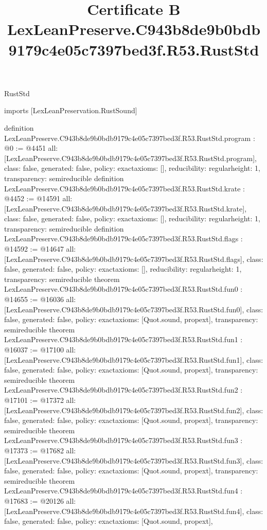 \begin{lexlean}{RustStd}
\title{Certificate B LexLeanPreserve.C943b8de9b0bdb9179c4e05c7397bed3f.R53.RustStd}
\begin{coremodule}
imports [LexLeanPreservation.RustSound]

definition LexLeanPreserve.C943b8de9b0bdb9179c4e05c7397bed3f.R53.RustStd.program : @0 := @4451 {
  all: [LexLeanPreserve.C943b8de9b0bdb9179c4e05c7397bed3f.R53.RustStd.program],
  class: false,
  generated: false,
  policy: exact{axioms: []},
  reducibility: regular{height: 1},
  transparency: semireducible
}
definition LexLeanPreserve.C943b8de9b0bdb9179c4e05c7397bed3f.R53.RustStd.krate : @4452 := @14591 {
  all: [LexLeanPreserve.C943b8de9b0bdb9179c4e05c7397bed3f.R53.RustStd.krate],
  class: false,
  generated: false,
  policy: exact{axioms: []},
  reducibility: regular{height: 1},
  transparency: semireducible
}
definition LexLeanPreserve.C943b8de9b0bdb9179c4e05c7397bed3f.R53.RustStd.flags : @14592 := @14647 {
  all: [LexLeanPreserve.C943b8de9b0bdb9179c4e05c7397bed3f.R53.RustStd.flags],
  class: false,
  generated: false,
  policy: exact{axioms: []},
  reducibility: regular{height: 1},
  transparency: semireducible
}
theorem LexLeanPreserve.C943b8de9b0bdb9179c4e05c7397bed3f.R53.RustStd.fun0 : @14655 := @16036 {
  all: [LexLeanPreserve.C943b8de9b0bdb9179c4e05c7397bed3f.R53.RustStd.fun0],
  class: false,
  generated: false,
  policy: exact{axioms: [Quot.sound, propext]},
  transparency: semireducible
}
theorem LexLeanPreserve.C943b8de9b0bdb9179c4e05c7397bed3f.R53.RustStd.fun1 : @16037 := @17100 {
  all: [LexLeanPreserve.C943b8de9b0bdb9179c4e05c7397bed3f.R53.RustStd.fun1],
  class: false,
  generated: false,
  policy: exact{axioms: [Quot.sound, propext]},
  transparency: semireducible
}
theorem LexLeanPreserve.C943b8de9b0bdb9179c4e05c7397bed3f.R53.RustStd.fun2 : @17101 := @17372 {
  all: [LexLeanPreserve.C943b8de9b0bdb9179c4e05c7397bed3f.R53.RustStd.fun2],
  class: false,
  generated: false,
  policy: exact{axioms: [Quot.sound, propext]},
  transparency: semireducible
}
theorem LexLeanPreserve.C943b8de9b0bdb9179c4e05c7397bed3f.R53.RustStd.fun3 : @17373 := @17682 {
  all: [LexLeanPreserve.C943b8de9b0bdb9179c4e05c7397bed3f.R53.RustStd.fun3],
  class: false,
  generated: false,
  policy: exact{axioms: [Quot.sound, propext]},
  transparency: semireducible
}
theorem LexLeanPreserve.C943b8de9b0bdb9179c4e05c7397bed3f.R53.RustStd.fun4 : @17683 := @20126 {
  all: [LexLeanPreserve.C943b8de9b0bdb9179c4e05c7397bed3f.R53.RustStd.fun4],
  class: false,
  generated: false,
  policy: exact{axioms: [Quot.sound, propext]},
}
\end{coremodule}
\end{lexlean}
